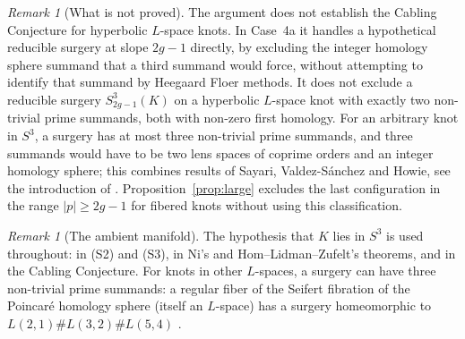 \documentclass[11pt]{article}
\newcommand{\Surg}[2]{S^3_{#1}(#2)}
\theoremstyle{definition}
\theoremstyle{remark}
\newtheorem{remark}[theorem]{Remark}
\begin{document}
\begin{remark}[What is not proved]\label{rem:notproved}
The argument does not establish the Cabling Conjecture for hyperbolic
\(L\)-space knots. In Case~4a it handles a hypothetical reducible surgery
at slope \(2g-1\) directly, by excluding the integer homology sphere
summand that a third summand would force, without attempting to identify
that summand by Heegaard Floer methods. It does not exclude a reducible
surgery \(\Surg{2g-1}{K}\) on a hyperbolic \(L\)-space knot with exactly
two non-trivial prime summands, both with non-zero first homology.
For an arbitrary knot in \(S^3\), a surgery has at most three
non-trivial prime summands, and three summands would have to be two lens
spaces of coprime orders and an integer homology sphere; this combines
results of Sayari, Valdez-S\'anchez and Howie, see the introduction of
\cite{Howie2010}. Proposition~\ref{prop:large} excludes the last
configuration in the range \(|p|\geq2g-1\) for fibered knots without
using this classification.
\end{remark}

\begin{remark}[The ambient manifold]
The hypothesis that \(K\) lies in \(S^3\) is used throughout: in (S2) and
(S3), in Ni's and Hom--Lidman--Zufelt's theorems, and in the Cabling
Conjecture. For knots in other \(L\)-spaces, a surgery can have three
non-trivial prime summands: a regular fiber of the Seifert fibration of
the Poincar\'e homology sphere (itself an \(L\)-space) has a surgery
homeomorphic to \(L(2,1)\#L(3,2)\#L(5,4)\) \cite{Caudell2021}.
\end{remark}
\end{document}

